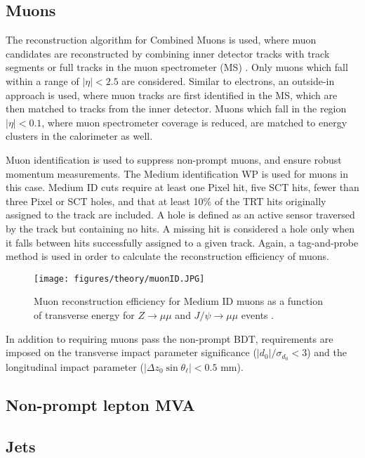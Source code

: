 \subsection{Muons}
\label{obj:muon}
                   
The reconstruction algorithm for Combined Muons is used, where muon candidates are reconstructed by combining inner detector tracks with track segments or full tracks in the muon spectrometer (MS) \cite{PERF-2014-05}. Only muons which fall within a range of $|\eta| < 2.5$ are considered. Similar to electrons, an outside-in approach is used, where muon tracks are first identified in the MS, which are then matched to tracks from the inner detector. Muons which fall in the region $|\eta| < 0.1$, where muon spectrometer coverage is reduced, are matched to energy clusters in the calorimeter as well.

Muon identification is used to suppress non-prompt muons, and ensure robust momentum measurements. The Medium identification WP is used for muons in this case. Medium ID cuts require at least one Pixel hit, five SCT hits, fewer than three Pixel or SCT holes, and that at least 10\% of the TRT hits originally assigned to the track are included. A hole is defined as an active sensor traversed by the track but containing no hits. A missing hit is considered a hole only when it falls between hits successfully assigned to a given track. Again, a tag-and-probe method is used in order to calculate the reconstruction efficiency of muons.

\begin{figure}[H]
\centering
   \texttt{[image: figures/theory/muonID.JPG]}
\caption{Muon reconstruction efficiency for Medium ID muons as a function of transverse energy for $Z\rightarrow \mu\mu$ and $J/\psi\rightarrow\mu\mu$ events \cite{PERF-2014-05}.}
\label{fig:eEffEt}
\end{figure}

In addition to requiring muons pass the non-prompt BDT, requirements are imposed on the transverse impact parameter significance ($|d_0|/\sigma_{d_0}<3$) and the longitudinal impact parameter ($|\Delta z_0 \sin \theta_\ell|<0.5$ mm).
 
\subsection{Non-prompt lepton MVA}
\label{sec:lepMVA}


\subsection{Jets}
\label{obj:jets}

